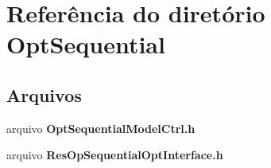 \section{Referência do diretório Opt\+Sequential}
\label{dir_288264023cc5a6a15e0741c165f06a13}
\subsection*{Arquivos}
\begin{DoxyCompactItemize}
\item 
arquivo {\bf Opt\+Sequential\+Model\+Ctrl.\+h}
\item 
arquivo {\bf Res\+Op\+Sequential\+Opt\+Interface.\+h}
\end{DoxyCompactItemize}
